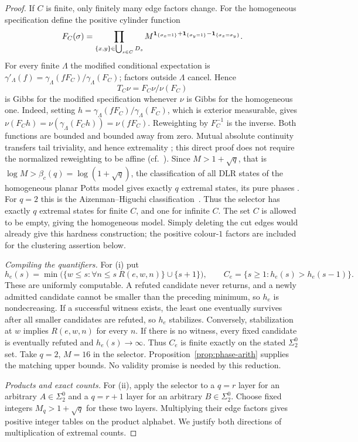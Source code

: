 \begin{proof}
If $C$ is finite, only finitely many edge factors change. For the homogeneous
specification define the positive cylinder function
\[
 F_C(\sigma)=\prod_{\{x,y\}\in\bigcup_{s\in C}D_s}
 M^{\mathbf 1_{\{\sigma_x=1\}}+\mathbf 1_{\{\sigma_y=1\}}
       -\mathbf 1_{\{\sigma_x=\sigma_y\}}}.
\]
For every finite $\Lambda$ the modified conditional expectation is
$\gamma'_\Lambda(f)=\gamma_\Lambda(fF_C)/\gamma_\Lambda(F_C)$;
factors outside $\Lambda$ cancel. Hence
\[
 T_C\nu=F_C\nu/\nu(F_C)
\]
is Gibbs for the modified specification whenever $\nu$ is Gibbs for the
homogeneous one. Indeed, setting
$h=\gamma_\Lambda(fF_C)/\gamma_\Lambda(F_C)$, which is exterior measurable,
gives $\nu(F_Ch)=\nu(\gamma_\Lambda(F_Ch))=\nu(fF_C)$.
Reweighting by $F_C^{-1}$ is the inverse. Both functions are bounded and
bounded away from zero. Mutual absolute continuity transfers tail triviality,
and hence extremality \cite[Theorem 7.7]{Georgii}; this direct proof does not
require the normalized reweighting to be affine (cf.\ \cite[Section 7.4]{Georgii}).
Since $M>1+\sqrt q$, that is $\log M>\beta_c(q)=\log(1+\sqrt q)$, the classification of all DLR states of the homogeneous planar Potts model gives exactly $q$ extremal states, its pure phases \cite[Theorem 1.1 and Corollary 1.3]{CDIV2014}.
For $q=2$ this is the Aizenman--Higuchi classification~\cite{Aizenman1980,Higuchi1981}.
Thus the selector has exactly $q$ extremal states for finite $C$, and one for
infinite $C$. The set $C$ is allowed to be empty, giving the homogeneous model.
Simply deleting the cut edges would already give this hardness construction;
the positive colour-$1$ factors are included for the clustering assertion below.

\emph{Compiling the quantifiers.}
For (i) put
\[
 h_e(s)=\min\bigl(\{w\le s:\forall n\le s\ R(e,w,n)\}\cup\{s+1\}\bigr),
 \qquad C_e=\{s\ge1:h_e(s)>h_e(s-1)\}.
\]
These are uniformly computable. A refuted candidate never returns, and a newly
admitted candidate cannot be smaller than the preceding minimum, so $h_e$ is
nondecreasing. If a successful witness exists, the least one eventually
survives after all smaller candidates are refuted, so $h_e$ stabilizes.
Conversely, stabilization at $w$ implies $R(e,w,n)$ for every $n$.
If there is no witness, every fixed candidate is eventually refuted and
$h_e(s)\to\infty$. Thus $C_e$ is finite exactly on the stated $\Sigma^0_2$ set.
Take $q=2$, $M=16$ in the selector. Proposition~\ref{prop:phase-arith} supplies
the matching upper bounds. No validity promise is needed by this reduction.

\emph{Products and exact counts.}
For (ii), apply the selector to a $q=r$ layer for an arbitrary
$A\in\Sigma^0_2$ and a $q=r+1$ layer for an arbitrary $B\in\Sigma^0_2$.
Choose fixed integers $M_q>1+\sqrt q$ for these two layers. Multiplying their
edge factors gives positive integer tables on the product alphabet.
We justify both directions of multiplication of extremal counts.


\end{proof}

